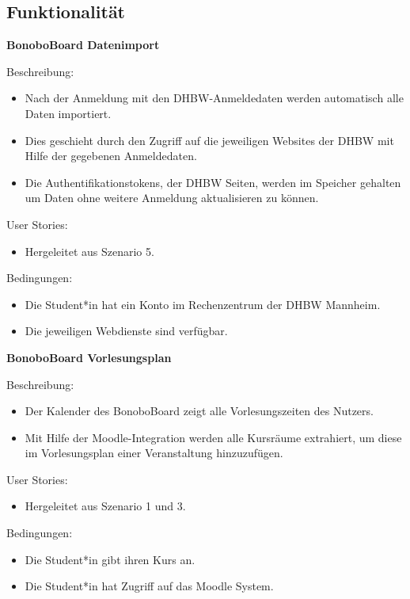 \documentclass[a4paper,11pt]{scrartcl}
\begin{document}
	\subsection{Funktionalität} %
	
\noindent\textbf{BonoboBoard Datenimport} \par\noindent	
Beschreibung: 
\begin{itemize}
\item Nach der Anmeldung mit den DHBW-Anmeldedaten werden automatisch alle Daten importiert.
\item 	Dies geschieht durch den  Zugriff auf die jeweiligen Websites der DHBW mit Hilfe der gegebenen Anmeldedaten.
\item 	Die Authentifikationstokens, der DHBW Seiten, werden im Speicher gehalten um Daten ohne weitere Anmeldung aktualisieren zu können.
\end{itemize}

User Stories: 
\begin{itemize}
\item Hergeleitet aus Szenario 5.
\end{itemize}

Bedingungen: 
\begin{itemize}
\item  Die Student*in hat ein Konto im Rechenzentrum der DHBW Mannheim.
\item Die jeweiligen Webdienste sind verfügbar.
\end{itemize}	
	
	
\noindent\textbf{BonoboBoard Vorlesungsplan} \par\noindent	
Beschreibung: 
\begin{itemize}
\item Der Kalender des BonoboBoard zeigt alle Vorlesungszeiten des Nutzers.
\item Mit Hilfe der Moodle-Integration werden alle Kursräume extrahiert, um diese im Vorlesungsplan einer Veranstaltung hinzuzufügen.
\end{itemize}

User Stories: 
\begin{itemize}
\item Hergeleitet aus Szenario 1 und 3.
\end{itemize}

Bedingungen: 
\begin{itemize}
\item Die Student*in gibt ihren Kurs an.
\item Die Student*in hat Zugriff auf das Moodle System.
\end{itemize}
\end{document}
